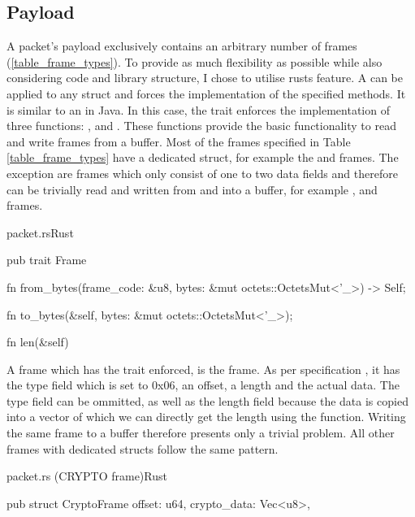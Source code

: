 \subsection{Payload}

A packet's payload exclusively contains an arbitrary number of frames (\ref{table_frame_types}). To provide as much flexibility as possible
while also considering code and library structure, I chose to utilise rusts  feature. A  can be
applied to any struct and forces the implementation of the specified methods. It is similar to an  in Java.
In this case, the  trait enforces
the implementation of three functions: ,  and . These functions
provide the basic functionality to read and write frames from a buffer. Most of the
frames specified in Table \ref{table_frame_types} have a dedicated struct, for example the  and  frames.
The exception are frames which only consist of one to two data fields and therefore can be trivially read and written from and into
a buffer, for example ,  and  frames.

\begin{codeblock}{packet.rs}{Rust}
    \begin{rustcode}
        pub trait Frame {
            fn from_bytes(frame_code: &u8, bytes: &mut octets::OctetsMut<'_>) -> Self;

            fn to_bytes(&self, bytes: &mut octets::OctetsMut<'_>);

            fn len(&self)
        }
    \end{rustcode}
\end{codeblock}

A frame which has the  trait enforced, is the  frame. As per specification \cite[110]{rfc9000},
it has the type field which is set to 0x06, an offset, a length and the actual data. The type field can be ommitted, as well as the
length field because the data is copied into a vector of which we can directly get the length using the  function.
Writing the same frame to a buffer therefore presents only a trivial problem. All other frames with dedicated structs follow the same
pattern.

\begin{codeblock}{packet.rs (CRYPTO frame)}{Rust}
    \begin{rustcode}
        pub struct CryptoFrame {
            offset: u64,
            crypto_data: Vec<u8>,
        }
    \end{rustcode}
\end{codeblock}

